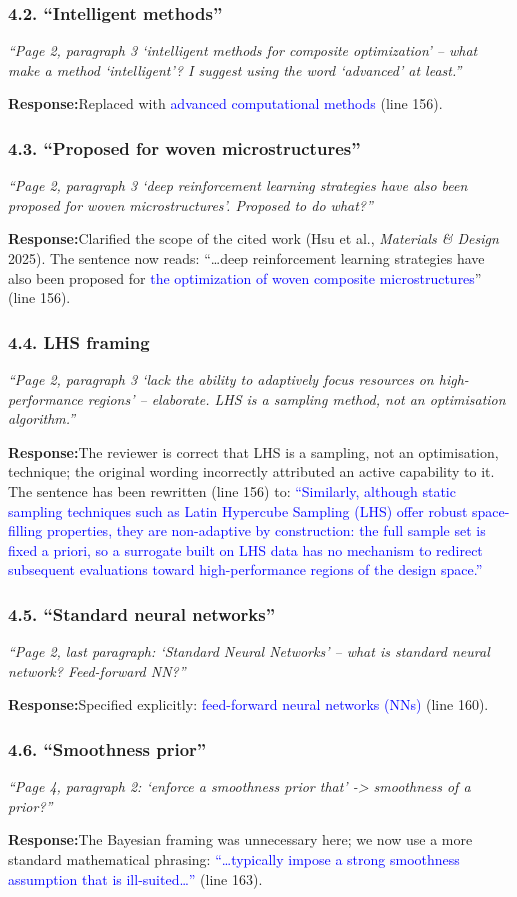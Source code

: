 \documentclass[11pt,a4paper]{article}
\newcommand{\new}[1]{\textcolor{blue}{#1}}
\newcommand{\rev}[1]{\par\noindent\textit{\small #1}\par\smallskip}
\newcommand{\resp}{\par\noindent\textbf{Response:}\space}
\begin{document}
\subsubsection*{4.2. ``Intelligent methods''}
\rev{``Page 2, paragraph 3 `intelligent methods for composite optimization' -- what make a method `intelligent'? I suggest using the word `advanced' at least.''}
\resp Replaced with \new{advanced computational methods} (line 156).

\subsubsection*{4.3. ``Proposed for woven microstructures''}
\rev{``Page 2, paragraph 3 `deep reinforcement learning strategies have also been proposed for woven microstructures'. Proposed to do what?''}
\resp Clarified the scope of the cited work (Hsu et al., \emph{Materials \& Design} 2025). The sentence now reads: ``\ldots deep reinforcement learning strategies have also been proposed for \new{the optimization of woven composite microstructures}'' (line 156).

\subsubsection*{4.4. LHS framing}
\rev{``Page 2, paragraph 3 `lack the ability to adaptively focus resources on high-performance regions' -- elaborate. LHS is a sampling method, not an optimisation algorithm.''}
\resp The reviewer is correct that LHS is a sampling, not an optimisation, technique; the original wording incorrectly attributed an active capability to it. The sentence has been rewritten (line 156) to: \new{``Similarly, although static sampling techniques such as Latin Hypercube Sampling (LHS) offer robust space-filling properties, they are non-adaptive by construction: the full sample set is fixed a priori, so a surrogate built on LHS data has no mechanism to redirect subsequent evaluations toward high-performance regions of the design space.''}

\subsubsection*{4.5. ``Standard neural networks''}
\rev{``Page 2, last paragraph: `Standard Neural Networks' -- what is standard neural network? Feed-forward NN?''}
\resp Specified explicitly: \new{feed-forward neural networks (NNs)} (line 160).

\subsubsection*{4.6. ``Smoothness prior''}
\rev{``Page 4, paragraph 2: `enforce a smoothness prior that' -> smoothness of a prior?''}
\resp The Bayesian framing was unnecessary here; we now use a more standard mathematical phrasing: \new{``\ldots typically impose a strong smoothness assumption that is ill-suited\ldots''} (line 163).
\end{document}
